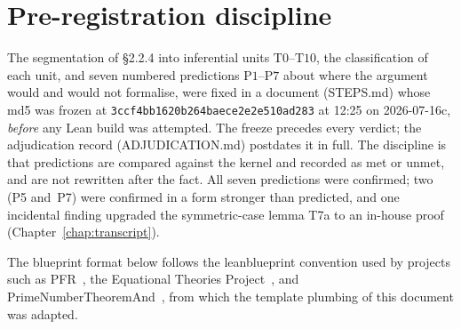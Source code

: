 \section{Pre-registration discipline}

The segmentation of \S2.2.4 into inferential units $\mathrm{T0}$--$\mathrm{T10}$, the
classification of each unit, and seven numbered predictions $\mathrm{P1}$--$\mathrm{P7}$
about where the argument would and would not formalise, were fixed in a document
(STEPS.md) whose md5 was frozen at \texttt{3ccf4bb1620b264baece2e2e510ad283} at
12:25 on 2026-07-16c, \emph{before} any Lean build was attempted.  The freeze precedes
every verdict; the adjudication record (ADJUDICATION.md) postdates it in full.  The
discipline is that predictions are compared against the kernel and recorded as met or
unmet, and are not rewritten after the fact.  All seven predictions were confirmed;
two (P5 and~P7) were confirmed in a form stronger than predicted, and one incidental
finding upgraded the symmetric-case lemma T7a to an in-house proof
(Chapter~\ref{chap:transcript}).

The blueprint format below follows the leanblueprint convention used by projects such
as PFR~\cite{pfr-blueprint}, the Equational Theories Project~\cite{equational-theories-blueprint},
and PrimeNumberTheoremAnd~\cite{pnt-blueprint}, from which the template plumbing of this
document was adapted.
